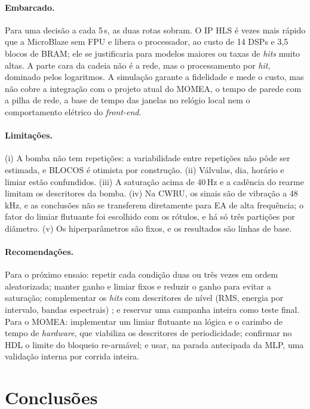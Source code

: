 \documentclass[12pt]{article}
\begin{document}
\paragraph{Embarcado.} Para uma decisão a cada 5\,s, as duas rotas sobram. \mbParagrafoRota{} O IP HLS é \mbFatorHls{} vezes mais rápido que a MicroBlaze sem FPU e libera o processador, ao custo de 14 DSPs e 3,5 blocos de BRAM; ele se justificaria para modelos maiores ou taxas de \textit{hits} muito altas. A parte cara da cadeia não é a rede, mas o processamento por \textit{hit}, dominado pelos logaritmos. A simulação garante a fidelidade e mede o custo, mas não cobre a integração com o projeto atual do MOMEA, o tempo de parede com a pilha de rede, a base de tempo das janelas no relógio local nem o comportamento elétrico do \textit{front-end}.

\paragraph{Limitações.} (i) A bomba não tem repetições: a variabilidade entre repetições não pôde ser estimada, e BLOCOS é otimista por construção. (ii) Válvulas, dia, horário e limiar estão confundidos. (iii) A saturação acima de 40\,Hz e a cadência do rearme limitam os descritores da bomba. (iv) Na CWRU, os sinais são de vibração a 48\,kHz, e as conclusões não se transferem diretamente para EA de alta frequência; o fator do limiar flutuante foi escolhido com os rótulos, e há só três partições por diâmetro. (v) Os hiperparâmetros são fixos, e os resultados são linhas de base.

\paragraph{Recomendações.} Para o próximo ensaio: repetir cada condição duas ou três vezes em ordem aleatorizada; manter ganho e limiar fixos e reduzir o ganho para evitar a saturação; complementar os \textit{hits} com descritores de nível (RMS, energia por intervalo, bandas espectrais) \cite{derakhshan1991}; e reservar uma campanha inteira como teste final. Para o MOMEA: implementar um limiar flutuante na lógica e o carimbo de tempo de \textit{hardware}, que viabiliza os descritores de periodicidade; confirmar no HDL o limite do bloqueio re-armável; e usar, na parada antecipada da MLP, uma validação interna por corrida inteira.

\section{Conclusões}
\label{sec:conclusoes}
\end{document}
